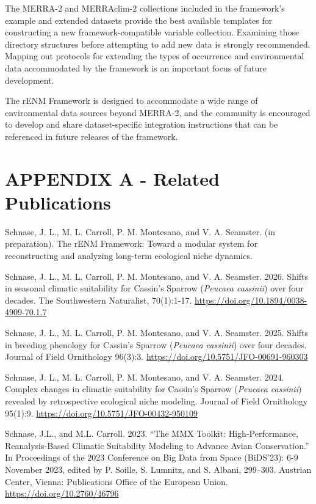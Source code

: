 \documentclass[
  letterpaper,
  DIV=11,
  numbers=noendperiod]{scrartcl}
\begin{document}
The MERRA-2 and MERRAclim-2 collections included in the framework's
example and extended datasets provide the best available templates for
constructing a new framework-compatible variable collection. Examining
those directory structures before attempting to add new data is strongly
recommended. Mapping out protocols for extending the types of occurrence
and environmental data accommodated by the framework is an important
focus of future development.

The rENM Framework is designed to accommodate a wide range of
environmental data sources beyond MERRA-2, and the community is
encouraged to develop and share dataset-specific integration
instructions that can be referenced in future releases of the framework.

\newpage{}

\section{APPENDIX A - Related
Publications}\label{appendix-a---related-publications}

Schnase, J. L., M. L. Carroll, P. M. Montesano, and V. A. Seamster. (in
preparation). The rENM Framework: Toward a modular system for
reconstructing and analyzing long-term ecological niche dynamics.

Schnase, J. L., M. L. Carroll, P. M. Montesano, and V. A. Seamster.
2026. Shifts in seasonal climatic suitability for Cassin's Sparrow
(\emph{Peucaea cassinii}) over four decades. The Southwestern
Naturalist, 70(1):1-17. \url{https://doi.org/10.1894/0038-4909-70.1.7}

Schnase, J. L., M. L. Carroll, P. M. Montesano, and V. A. Seamster.
2025. Shifts in breeding phenology for Cassin's Sparrow (\emph{Peucaea
cassinii}) over four decades. Journal of Field Ornithology 96(3):3.
\url{https://doi.org/10.5751/JFO-00691-960303}

Schnase, J. L., M. L. Carroll, P. M. Montesano, and V. A. Seamster.
2024. Complex changes in climatic suitability for Cassin's Sparrow
(\emph{Peucaea cassinii}) revealed by retrospective ecological niche
modeling. Journal of Field Ornithology 95(1):9.
\url{https://doi.org/10.5751/JFO-00432-950109}

Schnase, J.L., and M.L. Carroll. 2023. ``The MMX Toolkit:
High-Performance, Reanalysis-Based Climatic Suitability Modeling to
Advance Avian Conservation.'' In Proceedings of the 2023 Conference on
Big Data from Space (BiDS'23): 6-9 November 2023, edited by P. Soille,
S. Lumnitz, and S. Albani, 299--303. Austrian Center, Vienna:
Publications Office of the European Union.
\url{https://doi.org/10.2760/46796}
\end{document}
